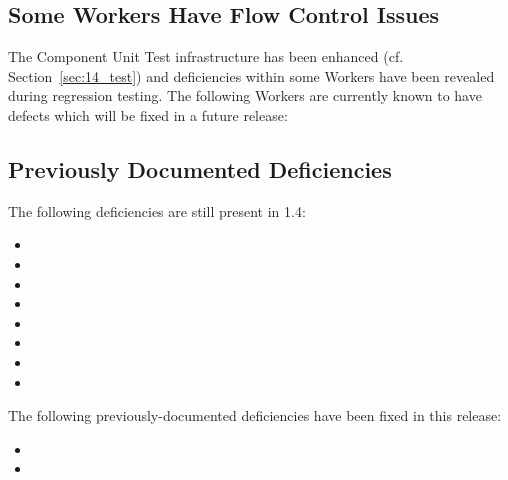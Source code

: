\subsection{Some  Workers Have Flow Control Issues} %
\label{bug:4486}
The Component Unit Test infrastructure has been enhanced (cf. Section~\ref{sec:14_test}) and deficiencies within some Workers have been revealed during regression testing. The following  Workers are currently known to have defects which will be fixed in a future release:
\begin{itemize}
\setlength\itemsep{0em} %
\begin{multicols}{3}
\item[] 
\item[] 
\item[] 
\item[] 
\item[] 
\end{multicols}
\end{itemize}

\subsection{Previously Documented Deficiencies}
The following deficiencies are still present in 1.4:
\begin{itemize}
\setlength\itemsep{0em} %
\item {}
\item {}
\item {}
\item {}
\item {}
\item {}
\item {}
\item {}
\end{itemize}

The following previously-documented deficiencies have been fixed in this release:
\begin{itemize}
\setlength\itemsep{0em} %
\item {}
\item {}
\end{itemize}


\label{sec:appendices}
